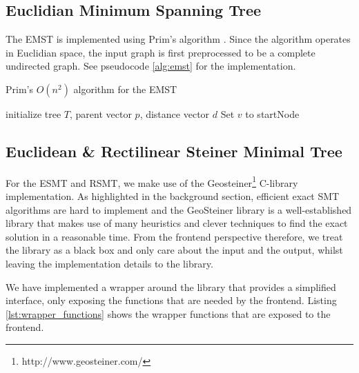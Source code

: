 \documentclass{l4proj}
\begin{document}
\wrapstuffclear
\subsection{Euclidian Minimum Spanning Tree}
The EMST is implemented using Prim's algorithm \citep[pp. 194--195]{Skiena2008}. Since the algorithm operates in Euclidian space, the input graph is first preprocessed to be a complete undirected graph. See pseudocode \ref{alg:emst} for the implementation.

\begin{algorithm}
      \caption{Prim's $O(n^2)$ algorithm for the EMST}
      \label{alg:emst}
      \SetAlgoLined
      initialize tree $T$, parent vector $p$, distance vector $d$\;
      Set $v$ to startNode\;
      \;
\end{algorithm}

\subsection{Euclidean \& Rectilinear Steiner Minimal Tree}
For the ESMT and RSMT, we make use of the Geosteiner\footnote{http://www.geosteiner.com/} C-library implementation. As highlighted in the background section, efficient exact SMT algorithms are hard to implement and the GeoSteiner library is a well-established library that makes use of many heuristics and clever techniques to find the exact solution in a reasonable time.
From the frontend perspective therefore, we treat the library as a black box and only care about the input and the output, whilst leaving the implementation details to the library.

We have implemented a wrapper around the library that provides a simplified interface, only exposing the functions that are needed by the frontend. Listing \ref{lst:wrapper_functions} shows the wrapper functions that are exposed to the frontend.
\end{document}
